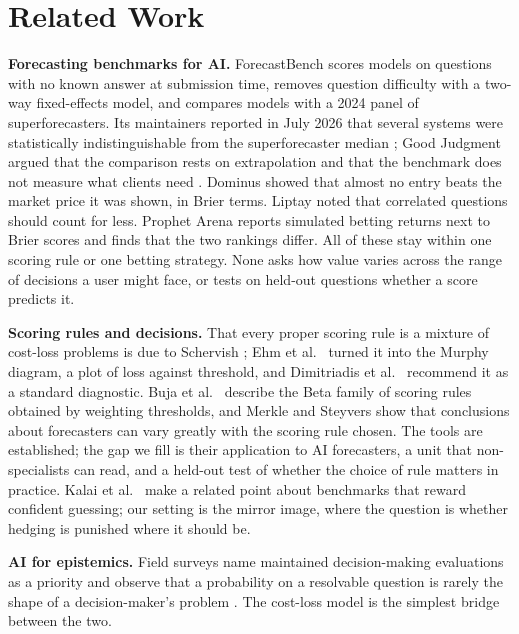 \documentclass[10pt]{article}
\begin{document}
\section{Related Work}
\textbf{Forecasting benchmarks for AI.} ForecastBench \cite{karger2025} scores models on questions with no known answer at submission time, removes question difficulty with a two-way fixed-effects model, and compares models with a 2024 panel of superforecasters. Its maintainers reported in July 2026 that several systems were statistically indistinguishable from the superforecaster median \cite{fri2026}; Good Judgment argued that the comparison rests on extrapolation and that the benchmark does not measure what clients need \cite{goodjudgment2026}. Dominus \cite{dominus2026} showed that almost no entry beats the market price it was shown, in Brier terms. Liptay \cite{liptay2026} noted that correlated questions should count for less. Prophet Arena \cite{yang2026} reports simulated betting returns next to Brier scores and finds that the two rankings differ. All of these stay within one scoring rule or one betting strategy. None asks how value varies across the range of decisions a user might face, or tests on held-out questions whether a score predicts it.

\textbf{Scoring rules and decisions.} That every proper scoring rule is a mixture of cost-loss problems is due to Schervish \cite{schervish1989}; Ehm et al.\ \cite{ehm2016} turned it into the Murphy diagram, a plot of loss against threshold, and Dimitriadis et al.\ \cite{dimitriadis2024} recommend it as a standard diagnostic. Buja et al.\ \cite{buja2005} describe the Beta family of scoring rules obtained by weighting thresholds, and Merkle and Steyvers \cite{merkle2013} show that conclusions about forecasters can vary greatly with the scoring rule chosen. The tools are established; the gap we fill is their application to AI forecasters, a unit that non-specialists can read, and a held-out test of whether the choice of rule matters in practice. Kalai et al.\ \cite{kalai2025} make a related point about benchmarks that reward confident guessing; our setting is the mirror image, where the question is whether hedging is punished where it should be.

\textbf{AI for epistemics.} Field surveys name maintained decision-making evaluations as a priority and observe that a probability on a resolvable question is rarely the shape of a decision-maker's problem \cite{state2026}. The cost-loss model is the simplest bridge between the two.
\end{document}
